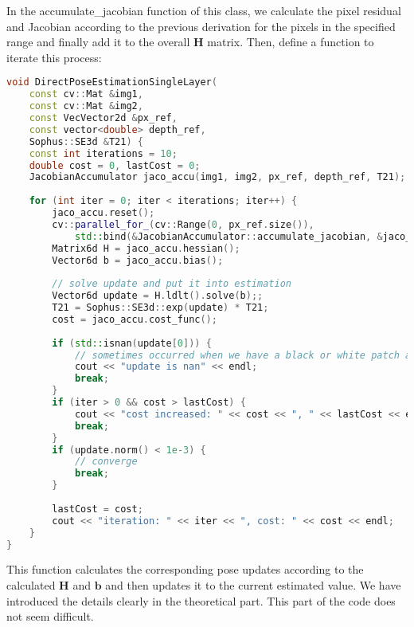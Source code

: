 In the accumulate\_jacobian function of this class, we calculate the pixel residual and Jacobian according to the previous derivation for the pixels in the specified range and finally add it to the overall $\mathbf{H}$ matrix. Then, define a function to iterate this process:
\begin{lstlisting}[language=c++,caption=slambook2/ch8/direct_method.cpp (part)]
void DirectPoseEstimationSingleLayer(
	const cv::Mat &img1,
	const cv::Mat &img2,
	const VecVector2d &px_ref,
	const vector<double> depth_ref,
	Sophus::SE3d &T21) {
	const int iterations = 10;
	double cost = 0, lastCost = 0;
	JacobianAccumulator jaco_accu(img1, img2, px_ref, depth_ref, T21);
	
	for (int iter = 0; iter < iterations; iter++) {
		jaco_accu.reset();
		cv::parallel_for_(cv::Range(0, px_ref.size()),
			std::bind(&JacobianAccumulator::accumulate_jacobian, &jaco_accu, std::placeholders::_1));
		Matrix6d H = jaco_accu.hessian();
		Vector6d b = jaco_accu.bias();
		
		// solve update and put it into estimation
		Vector6d update = H.ldlt().solve(b);;
		T21 = Sophus::SE3d::exp(update) * T21;
		cost = jaco_accu.cost_func();
		
		if (std::isnan(update[0])) {
			// sometimes occurred when we have a black or white patch and H is irreversible
			cout << "update is nan" << endl;
			break;
		}
		if (iter > 0 && cost > lastCost) {
			cout << "cost increased: " << cost << ", " << lastCost << endl;
			break;
		}
		if (update.norm() < 1e-3) {
			// converge
			break;
		}
		
		lastCost = cost;
		cout << "iteration: " << iter << ", cost: " << cost << endl;
	}
}
\end{lstlisting}
This function calculates the corresponding pose updates according to the calculated $\mathbf{H}$ and $\mathbf{b}$ and then updates it to the current estimated value. We have introduced the details clearly in the theoretical part. This part of the code does not seem difficult.

